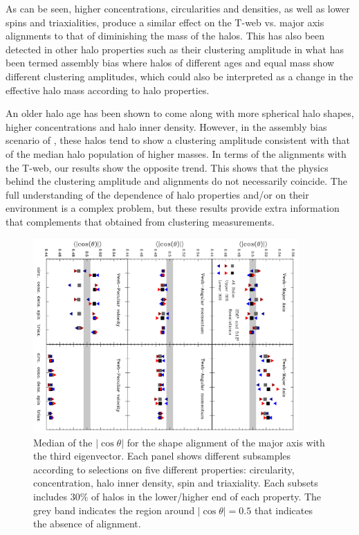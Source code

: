 \documentclass[useAMS,usenatbib]{mn2e}
\begin{document}
As can be seen, higher concentrations, circularities and densities,
as well as lower spins and triaxialities, produce a similar effect on the
T-web vs. major axis alignments to that of diminishing the mass
of the halos.  This has also been detected in other halo properties such
as their clustering amplitude in what has been termed assembly bias
\citep[][e.g.]{Gao2005,Li2008,Lacerna2011} where halos of different
ages and equal mass show different clustering amplitudes, which could
also be interpreted as a change in the effective halo mass according
to halo properties.

An older halo age has been shown to come along with more spherical halo
shapes, higher concentrations and halo inner density.  However, in the
assembly bias scenario of \cite{Gao2005}, these halos tend to show a clustering
amplitude consistent with that of the median halo population of higher masses.
In terms of the alignments with the T-web, our results show the opposite
trend.  This shows that the physics behind the clustering amplitude and
alignments do not necessarily coincide.  The full understanding of
the dependence of halo properties and/or on their environment is
a complex problem, but these results provide extra information that complements
that obtained from clustering measurements.


\begin{figure}
\includegraphics[width=0.90\textwidth,angle=90]{Fig6.pdf}
\caption{Median of the $|\cos\theta|$ for the shape alignment of the
  major axis with the third eigenvector. Each panel shows
  different subsamples according to selections on five different
  properties: circularity, concentration, halo inner density, spin and
  triaxiality. Each subsets includes $30\%$ of halos in the lower/higher end of each
  property. The grey band indicates the region around
  $|\cos\theta|=0.5$ that indicates the absence of alignment.}
\label{fig:drive}
\end{figure}
\end{document}

